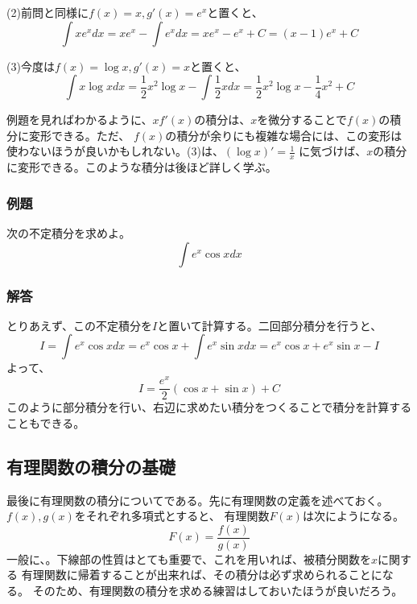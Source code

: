 \documentclass[a4j,dvipdfmx]{jsarticle}
\begin{document}
(2)前問と同様に$f(x)=x,g'(x)=e^x$と置くと、
\begin{equation*}
    \int xe^x dx=xe^x-\int e^xdx=xe^x-e^x+C=(x-1)e^x +C
\end{equation*}

(3)今度は$f(x)=\log x,g'(x)=x$と置くと、
\begin{equation*}
    \int x\log xdx=\frac{1}{2}x^2\log x-\int \frac{1}{2}xdx=\frac{1}{2}x^2\log x-\frac{1}{4}x^2+C
\end{equation*}

例題を見ればわかるように、$xf'(x)$の積分は、$x$を微分することで$f(x)$の積分に変形できる。ただ、
$f(x)$の積分が余りにも複雑な場合には、この変形は使わないほうが良いかもしれない。(3)は、$(\log x)'=\frac{1}{x}$
に気づけば、$x$の積分に変形できる。このような積分は後ほど詳しく学ぶ。
\subsubsection{例題}
次の不定積分を求めよ。
\begin{equation*}
    \int e^x \cos xdx
\end{equation*}
\subsubsection*{解答}

とりあえず、この不定積分を$I$と置いて計算する。二回部分積分を行うと、
\begin{equation*}
    I=\int e^x \cos xdx=e^x\cos x + \int e^x \sin xdx=e^x\cos x+e^x \sin x-I 
\end{equation*}
よって、
\begin{equation*}
    I=\frac{e^x}{2}(\cos x+\sin x)+C
\end{equation*}
このように部分積分を行い、右辺に求めたい積分をつくることで積分を計算することもできる。
\newpage
\subsection{有理関数の積分の基礎}
最後に有理関数の積分についてである。先に有理関数の定義を述べておく。$f(x),g(x)$をそれぞれ多項式とすると、
有理関数$F(x)$は次にようになる。
\begin{equation*}
    F(x)=\frac{f(x)}{g(x)}
\end{equation*}
一般に、。下線部の性質はとても重要で、これを用いれば、被積分関数を$x$に関する
有理関数に帰着することが出来れば、その積分は必ず求められることになる。
そのため、有理関数の積分を求める練習はしておいたほうが良いだろう。
\end{document}
